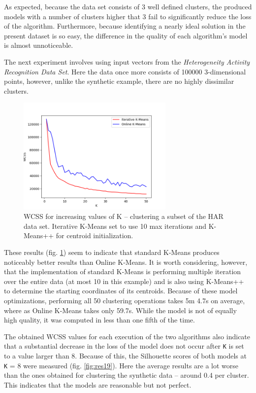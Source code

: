 \documentclass{l4proj}
\begin{document}
As expected, because the data set consists of 3 well defined clusters, the produced models with a number of clusters higher that 3 fail to significantly reduce the loss of the algorithm. Furthermore, because identifying a nearly ideal solution in the present dataset is so easy, the difference in the quality of each algorithm's model is almost unnoticeable.

The next experiment involves using input vectors from the \textit{Heterogeneity Activity Recognition Data Set}. Here the data once more consists of 100000 3-dimensional points, however, unlike the synthetic example, there are no highly dissimilar clusters. 

\begin{figure}[H]
	\centering
    \includegraphics[width=0.68\textwidth]{images/result2}
    \caption{WCSS for increasing values of K -- clustering a subset of the HAR data set. Iterative K-Means set to use 10 max iterations and K-Means++ for centroid initialization. } 
    \label{fig:res2}
\end{figure}

These results (fig. \ref{fig:res2}) seem to indicate that standard K-Means produces noticeably better results than Online K-Means. It is worth considering, however, that the implementation of standard K-Means is performing multiple iteration over the entire data (at most 10 in this example) and is also using K-Means++ to determine the starting coordinates of its centroids. Because of these model optimizations, performing all 50 clustering operations takes 5m 4.7s on average, where as Online K-Means takes only 59.7s. While the model is not of equally high quality, it was computed in less than one fifth of the time.

The obtained WCSS values for each execution of the two algorithms also indicate that a substantial decrease in the loss of the model does not occur after \texttt{K} is set to a value larger than 8. Because of this, the Silhouette scores of both models at \texttt{K} = 8 were measured (fig. \ref{fig:res19}). Here the average results are a lot worse than the ones obtained for clustering the synthetic data -- around 0.4 per cluster. This indicates that the models are reasonable but not perfect.
\end{document}
